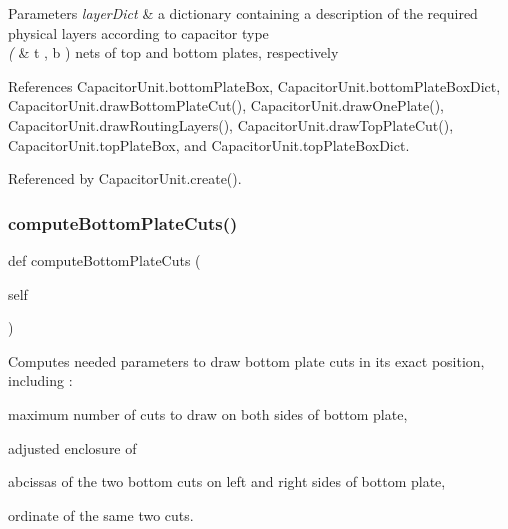 \begin{DoxyParams}{Parameters}
{\em layer\+Dict} & a dictionary containing a description of the required physical layers according to capacitor type \\
\hline
{\em (} & t , b ) nets of top and bottom plates, respectively \\
\hline
\end{DoxyParams}


References Capacitor\+Unit.\+bottom\+Plate\+Box, Capacitor\+Unit.\+bottom\+Plate\+Box\+Dict, Capacitor\+Unit.\+draw\+Bottom\+Plate\+Cut(), Capacitor\+Unit.\+draw\+One\+Plate(), Capacitor\+Unit.\+draw\+Routing\+Layers(), Capacitor\+Unit.\+draw\+Top\+Plate\+Cut(), Capacitor\+Unit.\+top\+Plate\+Box, and Capacitor\+Unit.\+top\+Plate\+Box\+Dict.



Referenced by Capacitor\+Unit.\+create().

\mbox{\label{classpython_1_1capacitorunit_1_1CapacitorUnit_addb554b11e23dd09df70724d5f72c740}} 
\subsubsection{\texorpdfstring{compute\+Bottom\+Plate\+Cuts()}{computeBottomPlateCuts()}}
{\footnotesize\ttfamily def compute\+Bottom\+Plate\+Cuts (\begin{DoxyParamCaption}\item[{}]{self }\end{DoxyParamCaption})}



Computes needed parameters to draw bottom plate cuts in its exact position, including \+: 


\begin{DoxyItemize}
\item maximum number of cuts to draw on both sides of bottom plate,
\item adjusted enclosure of
\item abcissas of the two bottom cuts on left and right sides of bottom plate,
\item ordinate of the same two cuts.
\end{DoxyItemize}

